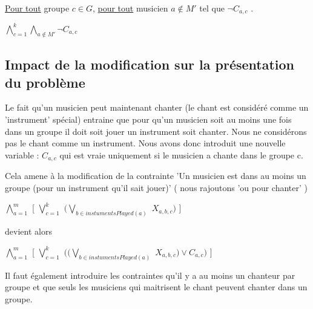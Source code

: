 \documentclass[a4paper,10pt]{article}
\begin{document}
\underline{Pour tout} groupe $c \in G$, \underline{pour tout} musicien $a \notin M'$ tel que $\neg C_{a,c}$ .

$ \bigwedge \limits_{c=1}^{k}  \bigwedge \limits_{a \notin M'} \neg C_{a,c}$


\subsection{Impact de la modification sur la présentation du problème}

Le fait qu'un musicien peut maintenant chanter (le chant est considéré comme un 'instrument' spécial) entraine que pour qu'un musicien soit au moins une fois dans un groupe il doit soit jouer un instrument soit chanter.
Nous ne considérons pas le chant comme un instrument. Nous avons donc introduit une nouvelle variable : $C_{a,c} $ qui est vraie uniquement si le musicien a chante dans le groupe c.

Cela amene à la modification de la contrainte 'Un musicien est dans au moins un groupe (pour un instrument qu'il sait jouer)' ( nous rajoutons 'ou pour chanter' )  

$\bigwedge \limits_{a=1}^{m}$ [ $\bigvee \limits_{c=1}^{k}$ $ (  \bigvee \limits_{b \in instumentsPlayed(a) }$  $X_{a,b,c}) $ ]

devient alors

$\bigwedge \limits_{a=1}^{m}$ [ $\bigvee \limits_{c=1}^{k}$ $ ( ( \bigvee \limits_{b \in instumentsPlayed(a) }$  $X_{a,b,c}) \vee C_{a,c} ) $ ]

Il faut également introduire les contraintes qu'il y a au moins un chanteur par groupe et que seuls les musiciens qui maitrisent le chant peuvent chanter dans un groupe.
\end{document}
